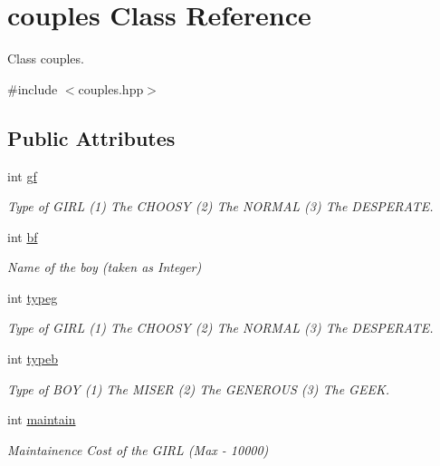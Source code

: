 \hypertarget{classcouples}{\section{couples Class Reference}
\label{classcouples}
}


Class couples.  




{\ttfamily \#include $<$couples.\-hpp$>$}

\subsection*{Public Attributes}
\begin{DoxyCompactItemize}
\item 
int \hyperlink{classcouples_a13f719ac7e434039c139de22fa57b256}{gf}
\begin{DoxyCompactList}\small\item\em Type of G\-I\-R\-L (1) The C\-H\-O\-O\-S\-Y (2) The N\-O\-R\-M\-A\-L (3) The D\-E\-S\-P\-E\-R\-A\-T\-E. \end{DoxyCompactList}\item 
int \hyperlink{classcouples_a45f3a15dcd4ab9cf580cf4915f4b72f1}{bf}
\begin{DoxyCompactList}\small\item\em Name of the boy (taken as Integer) \end{DoxyCompactList}\item 
int \hyperlink{classcouples_aa426275873426f8c89fcc51cc0dc35d7}{typeg}
\begin{DoxyCompactList}\small\item\em Type of G\-I\-R\-L (1) The C\-H\-O\-O\-S\-Y (2) The N\-O\-R\-M\-A\-L (3) The D\-E\-S\-P\-E\-R\-A\-T\-E. \end{DoxyCompactList}\item 
int \hyperlink{classcouples_afabf41b3fd47b1e0183362508a2ff97d}{typeb}
\begin{DoxyCompactList}\small\item\em Type of B\-O\-Y (1) The M\-I\-S\-E\-R (2) The G\-E\-N\-E\-R\-O\-U\-S (3) The G\-E\-E\-K. \end{DoxyCompactList}\item 
int \hyperlink{classcouples_a01f522776c66cb6a3f81fb8622d3398d}{maintain}
\begin{DoxyCompactList}\small\item\em Maintainence Cost of the G\-I\-R\-L (Max -\/ 10000) \end{DoxyCompactList}\item 

\end{DoxyCompactItemize}

